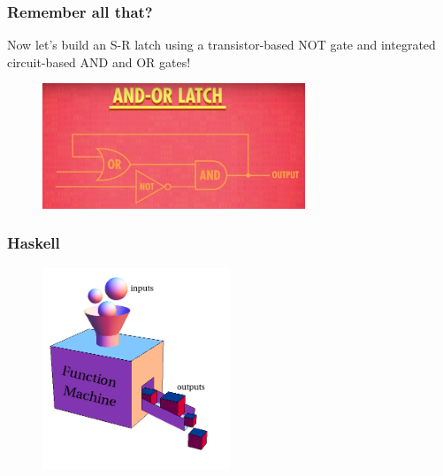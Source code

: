 \documentclass{beamer}
\begin{document}
\begin{frame}
  \frametitle{Remember all that?}

  Now let's build an S-R latch using a transistor-based NOT gate and integrated
  circuit-based AND and OR gates!

  \begin{figure}
    \centering
    \includegraphics[width=0.7\textwidth]{res/and-or-latch.png}
  \end{figure}
\end{frame}

\begin{frame}
  \frametitle{Haskell}


  \begin{figure}
    \centering
    \includegraphics[width=0.5\textwidth]{res/function-machine.png}
  \end{figure}
\end{frame}
\end{document}
